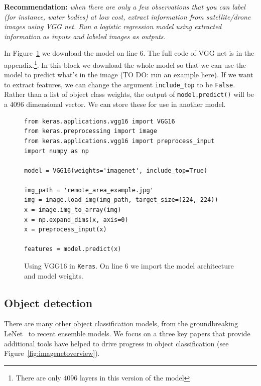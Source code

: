 \documentclass[12pt, a4paper, oneside, headinclude, footinclude]{article}
\begin{document}
\textbf{Recommendation:} \textit{when there are only a few observations that you can
label (for instance, water bodies) at low cost, extract information from
satellite/drone images using VGG net. Run a logistic regression model using
extracted information as inputs and labeled images as outputs.}

In Figure~\ref{alg:vgg} we download the model on line 6. The full code of VGG net
is in the appendix.\footnote{There are only 4096 layers in this version of the
model}. In this block we download the whole model so that we can use the model
to predict what's in the image (TO DO: run an example here). If we want to
extract features, we can change the argument \texttt{include\_top} to be
\texttt{False}. Rather than a list of object class weights, the output of
\texttt{model.predict()} will be a 4096 dimensional vector. We can store these
for use in another model.

\begin{figure}
\begin{verbatim}
from keras.applications.vgg16 import VGG16
from keras.preprocessing import image
from keras.applications.vgg16 import preprocess_input
import numpy as np

model = VGG16(weights='imagenet', include_top=True)

img_path = 'remote_area_example.jpg'
img = image.load_img(img_path, target_size=(224, 224))
x = image.img_to_array(img)
x = np.expand_dims(x, axis=0)
x = preprocess_input(x)

features = model.predict(x)
\end{verbatim}
    \caption[Using VGG16 in \texttt{Keras}]{Using VGG16 in \texttt{Keras}. On
    line 6 we import the model architecture and model weights.\label{alg:vgg}}
\end{figure}

\subsection{Object detection}

There are many other object classification models, from the groundbreaking
LeNet~\cite{lecun1998gradient} to recent ensemble models. We focus on a three
key papers that provide additional tools have helped to drive progress in
object classification (see Figure~\ref{fig:imagenetoverview}).
\end{document}
